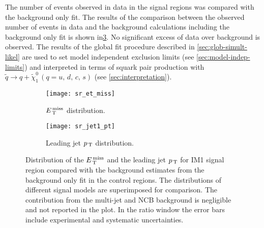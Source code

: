 The number of events observed in data in the signal regions was compared with
the background only fit. The results of the comparison between the observed
number of events in data and the background calculations including the
background only fit is shown in\cref{fig:sr_plots}.
No significant excess of data over background is observed. The results of the
global fit procedure described in \cref{sec:glob-simult-likel} are used to set
model independent exclusion limits (see \cref{sec:model-indep-limits}) and
interpreted in terms of squark pair production with
$\widetilde{q} \rightarrow q + \widetilde{\chi}_1^0\, (q = u,\, d,\, c,\, s)$
(see \cref{sec:interpretation}).
\begin{figure}[!th]
  \centering
  \begin{subfigure}[t]{.48\linewidth}
    \texttt{[image: sr\_et\_miss]}
    \caption{$E_\mathrm{\, T}^\mathrm{\, miss}$ distribution.}
    \label{fig:sr_et_miss}
  \end{subfigure}
  \begin{subfigure}[t]{.48\linewidth}
    \texttt{[image: sr\_jet1\_pt]}
    \caption{Leading jet $p_\mathrm{\, T}$ distribution.}
    \label{fig:sr_jet1_pt}
  \end{subfigure}
  \caption{Distribution of the $E_\mathrm{\, T}^\mathrm{\, miss}$ and the leading jet $p_\mathrm{\, T}$ for IM1 signal
    region compared with the background estimates from the background only fit
    in the control regions. The distributions of different signal models are
    superimposed for comparison. The contribution from the multi-jet and NCB
    background is negligible and not reported in the plot. In the ratio window
    the error bars include experimental and systematic uncertainties.}
  \label{fig:sr_plots}
\end{figure}
